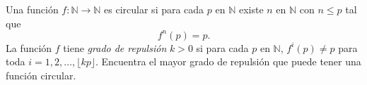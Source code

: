Una función $f:\mathbb N\to\mathbb N$ es circular si para cada $p$ en $\mathbb N$ existe $n$ en $\mathbb N$ con $n\leq p$ tal que \[f^n(p)=p.\] La función $f$ tiene \emph{grado de repulsión} $k\gt 0$ si para cada $p$ en $\mathbb N$, $f^i(p)\neq p$ para toda $i=1,2,\dots,\lfloor kp\rfloor$. Encuentra el mayor grado de repulsión que puede tener una función circular.